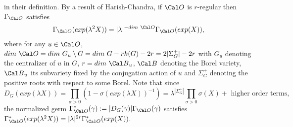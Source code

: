 in their definition. By a result of Harish-Chandra, if
${\Cal O}$ is $r$-regular then $\Gamma_{\Cal O}$ satisfies
$$
\Gamma_{\Cal O}(exp(\lambda^2 X))=|\lambda|^{-dim\ {\Cal O}}
\Gamma_{\Cal O}(exp( X)),
$$
where for any $u\in {\Cal O}$, 
$dim\ {\Cal O}=dim\ G_u\setminus G=dim\ G -rk(G)-2r=2|\Sigma^+_G|-2r$ with
$G_u$ denoting the centralizer of $u$ in $G$, 
$r=dim\ {\Cal B}_u$, ${\Cal B}$ denoting the Borel variety,
${\Cal B}_u$ its subvariety fixed by the conjugation action of $u$
and $\Sigma^+_G$ denoting the positive roots with respect to some Borel.
Note that since
$$
D_G(exp(\lambda X))=\prod_{\sigma >0}(1-\sigma(exp(\lambda X))^{-1})
=\lambda^{|\Sigma^+_G|}\prod_{\sigma >0}\sigma(X)+\text{ higher order terms},
$$
the normalized germ $\Gamma^*_{\Cal O}(\gamma)
:=|D_G(\gamma)|\Gamma_{\Cal O}(\gamma)$ satisfies
$\Gamma^*_{\Cal O}(exp(\lambda^2 X))
=|\lambda|^{2r}\Gamma^*_{\Cal O}(exp( X))$.

